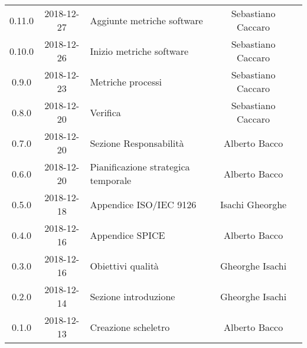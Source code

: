 {\begin{longtable}{c c C{4cm} c  c }
		0.11.0 &
		2018-12-27 &
		Aggiunte metriche software  &
		Sebastiano Caccaro &
		\reda{}
		\\
		0.10.0 &
		2018-12-26 &
		Inizio metriche software &
		Sebastiano Caccaro &
		\reda{}
		\\
		0.9.0 &
		2018-12-23 &
		Metriche processi &
		Sebastiano Caccaro &
		\reda{}
		\\
		0.8.0 &
		2018-12-20 &
		Verifica &
		Sebastiano Caccaro &
		\reda{}		
		\\
		0.7.0 &
		2018-12-20 &
		Sezione Responsabilità &
		Alberto Bacco &
		\reda{}
		\\
		0.6.0 &
		2018-12-20 &
		Pianificazione strategica temporale &
		Alberto Bacco &
		\reda{}
		\\
		0.5.0 &
		2018-12-18 &
		Appendice ISO/IEC 9126 &
		Isachi Gheorghe &
		\reda{}
		\\
		0.4.0 &
		2018-12-16 &
		Appendice SPICE &
		Alberto Bacco &
		\reda{}
		\\
		0.3.0 &
		2018-12-16 &
		Obiettivi qualità &
		Gheorghe Isachi &
		\reda{}
		\\
		0.2.0 &
		2018-12-14 &
		Sezione introduzione &
		Gheorghe Isachi&
		\reda{}
		\\
		0.1.0 &
		2018-12-13 &
		Creazione scheletro &
		Alberto Bacco&
		\reda{}
		\\
	\end{longtable}

}